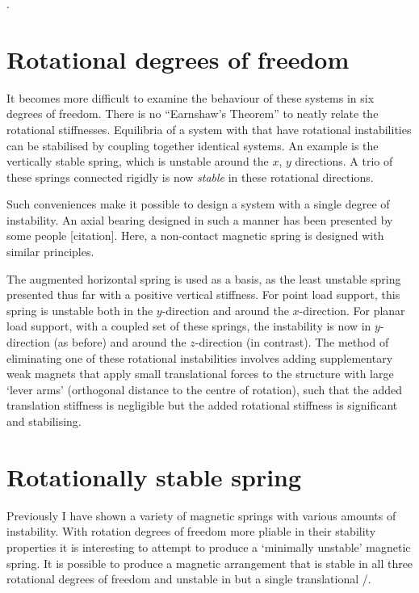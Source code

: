 \documentclass[11pt,a4paper]{memoir}
\begin{document}
\cite{choi2003}. 



\section{Rotational degrees of freedom}

It becomes more difficult to examine the behaviour of these systems in
six degrees of freedom. There is no ``Earnshaw's Theorem'' to neatly
relate the rotational stiffnesses. Equilibria of a system with that
have rotational instabilities can be stabilised by coupling together
identical systems. An example is the vertically stable spring, which
is unstable around the $x$, $y$ directions. A trio of these springs
connected rigidly is now \emph{stable} in these rotational directions.

Such conveniences make it possible to design a system with a single
degree of instability. An axial bearing designed in such a manner has
been presented by some people [citation]. Here, a non-contact magnetic
spring is designed with similar principles.

The augmented horizontal spring is used as a basis, as the least
unstable spring presented thus far with a positive vertical
stiffness. For point load support, this spring is unstable both in the
$y$-direction and around the $x$-direction. For planar load support,
with a coupled set of these springs, the instability is now in $y$-direction
(as before) and around the $z$-direction (in contrast). The
method of eliminating one of these rotational instabilities involves
adding supplementary weak magnets that apply small translational
forces to the structure with large `lever arms' (orthogonal distance
to the centre of rotation), such that the added translation stiffness
is negligible but the added rotational stiffness is significant and
stabilising.


\section{Rotationally stable spring}

Previously I have shown a variety of magnetic springs with various
amounts of instability. With rotation degrees of freedom more pliable
in their stability properties it is interesting to attempt to produce
a `minimally unstable' magnetic spring. It is possible to produce a
magnetic arrangement that is stable in all three rotational degrees of
freedom and unstable in but a single translational \dof/.
\end{document}
